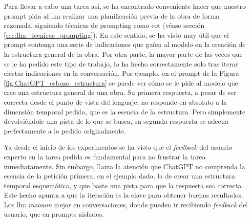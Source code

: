 Para llevar a cabo una tarea así, se ha encontrado conveniente hacer que nuestro prompt pida al \gls{llm} realizar una planificación previa de la obra de forma razonada, siguiendo técnicas de prompting como \gls{cot} (véase sección \ref{sec:llm_tecnicas_prompting}). En este sentido, se ha visto muy útil que el prompt contenga una serie de indicaciones que guíen al modelo en la creación de la estructura general de la obra. Por otra parte, la mayor parte de las veces que se le ha pedido este tipo de trabajo, lo ha hecho correctamente solo tras iterar ciertas indicaciones en la conversación.  Por ejemplo, en el prompt de la Figura \ref{fig:ChatGPT_esbozo_estructura} se puede ver cómo se le pide al modelo que cree una estructura general de una obra. Su primera respuesta, a pesar de ser correcta desde el punto de vista del lenguaje, no responde en absoluto a la dimensión temporal pedida, que es la esencia de la estructura. Pero simplemente devolviéndole una pista de lo que se busca, su segunda respuesta se adecua perfectamente a lo pedido originalmente. 

Ya desde el inicio de los experimentos se ha visto que el \emph{feedback} del usuario experto en la tarea pedida es fundamental para no frustrar la tarea inmediatamente. Sin embargo, llama la atención que ChatGPT no comprenda la esencia de la petición primera, en el ejemplo dado, la de crear una estructura temporal esquemática, y que baste una pista para que la respuesta sea correcta. Este hecho apunta a que la iteración es la clave para obtener buenos resultados. Los \gls{llm} \emph{razonan} mejor en conversaciones, donde pueden ir recibiendo \emph{feedback} del usuario, que en prompts aislados.


